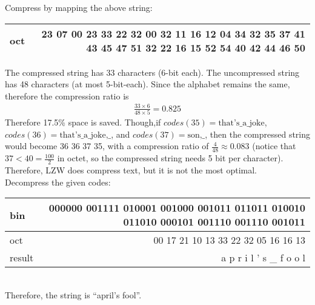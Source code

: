 \documentclass[12pt]{article}
\begin{document}
Compress by mapping the above string:\\
\begin{tabular}{|l|r|}
\hline
oct & 23 07 00 23 33 22 32 00 32 11 16 12 04 34 32 35 37 41 43 45 47 51 32 22 16 15 52 54 40 42 44 46 50\\\hline
\end{tabular}
The compressed string has 33 characters (6-bit each).
The uncompressed string has 48 characters (at most 5-bit-each).
Since the alphabet remains the same, therefore the compression ratio is
\begin{align*}
\frac{33 \times 6}{48 \times 5} = 0.825
\end{align*}
Therefore 17.5\% space is saved.
Though,if $codes(35) = \text{that's\_a\_joke}$, $codes(36)=\text{that's\_a\_joke,\_}$, and $codes(37) = \text{son,\_}$, then the compressed string would become 36 36 37 35, with a compression ratio of $\frac{4}{48} \approx 0.083$
(notice that $37 < 40 = \frac{100}{2} $ in octet, so the compressed string needs 5 bit per character).
Therefore, LZW does compress text, but it is not the most optimal.
\done\\


 Decompress the given codes:\\
\begin{tabular}{|l|r|}
\hline
bin & 000000 001111 010001 001000 001011 011011 010010 011010 000101 001110 001110 001011\\\hline
oct & 00 17 21 10 13 33 22 32 05 16 16 13\\\hline
result & a p r i l ' s \_ f o o l\\\hline
\end{tabular}\\
Therefore, the string is ``april's fool''.
\done
\end{document}
